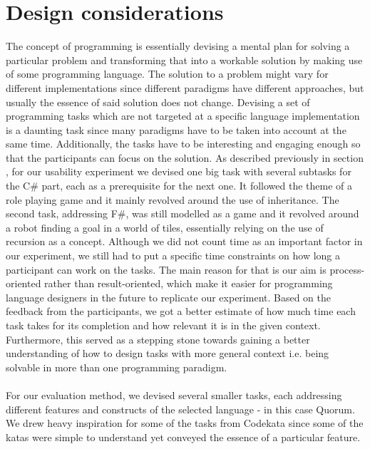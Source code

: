 
\chapter{Design considerations}
The concept of programming is essentially devising a mental plan for solving a particular problem and transforming that into a workable solution by making use of some programming language. The solution to a problem might vary for different implementations since different paradigms have different approaches, but usually the essence of said solution does not change. Devising a set of programming tasks which are not targeted at a specific language implementation is a daunting task since many paradigms have to be taken into account at the same time. Additionally, the tasks have to be interesting and engaging enough so that the participants can focus on the solution. As described previously in section , for our usability experiment we devised one big task with several subtasks for the C\# part, each as a prerequisite for the next one. It followed the theme of a role playing game and it mainly revolved around the use of inheritance. The second task, addressing F\#, was still modelled as a game and it revolved around a robot finding a goal in a world of tiles, essentially relying on the use of recursion as a concept. Although we did not count time as an important factor in our experiment, we still had to put a specific time constraints on how long a participant can work on the tasks. The main reason for that is our aim is process-oriented rather than result-oriented, which make it easier for programming language designers in the future to replicate our experiment. Based on the feedback from the participants, we got a better estimate of how much time each task takes for its completion and how relevant it is in the given context. Furthermore, this served as a stepping stone towards gaining a better understanding of how to design tasks with more general context i.e. being solvable in more than one programming paradigm. 
\\\\For our evaluation method, we devised several smaller tasks, each addressing different features and constructs of the selected language - in this case Quorum. We drew heavy inspiration for some of the tasks from Codekata \cite{Codekata} since some of the katas were simple to understand yet conveyed the essence of a particular feature. 

